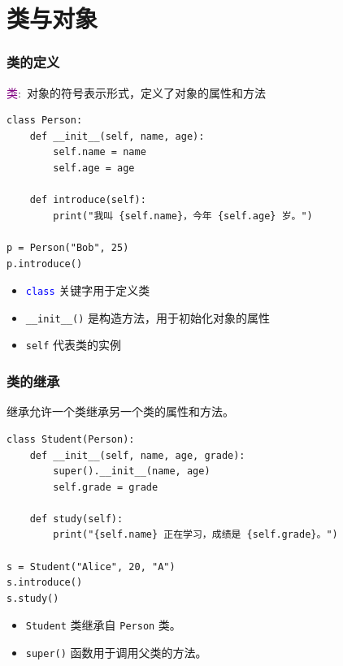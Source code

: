 \section{类与对象}
\begin{frame}[fragile]
    \frametitle{类的定义}
    \textcolor{purple}{类}:~对象的符号表示形式，定义了对象的属性和方法
    \begin{lstlisting}[style=pythonstyle]
class Person:
    def __init__(self, name, age):
        self.name = name
        self.age = age

    def introduce(self):
        print("我叫 {self.name}，今年 {self.age} 岁。")

p = Person("Bob", 25)
p.introduce()
    \end{lstlisting}
    \begin{itemize}
	    \item \texttt{\textcolor{blue}{class}} 关键字用于定义类
        \item \texttt{\_\_init\_\_()} 是构造方法，用于初始化对象的属性
        \item \texttt{self} 代表类的实例
    \end{itemize}
\end{frame}
%
\begin{frame}[fragile]
    \frametitle{类的继承}
    继承允许一个类继承另一个类的属性和方法。
    \begin{lstlisting}[style=pythonstyle]
class Student(Person):
    def __init__(self, name, age, grade):
        super().__init__(name, age)
        self.grade = grade

    def study(self):
        print("{self.name} 正在学习，成绩是 {self.grade}。")

s = Student("Alice", 20, "A")
s.introduce()
s.study()
    \end{lstlisting}
    \begin{itemize}
        \item \texttt{Student} 类继承自 \texttt{Person} 类。
        \item \texttt{super()} 函数用于调用父类的方法。
    \end{itemize}
\end{frame}
%

